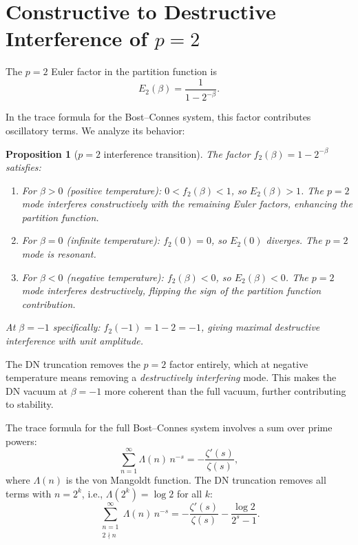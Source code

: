 \documentclass[12pt,a4paper]{article}
\newtheorem{proposition}[theorem]{Proposition}
\begin{document}
\section{Constructive to Destructive Interference of $p=2$}
\label{sec:interference}

The $p=2$ Euler factor in the partition function is
\begin{equation}
  E_2(\beta) = \frac{1}{1-2^{-\beta}}.
\end{equation}

In the trace formula for the Bost--Connes system, this factor contributes oscillatory terms. We analyze its behavior:

\begin{proposition}[$p=2$ interference transition]\label{prop:interference}
The factor $f_2(\beta) = 1 - 2^{-\beta}$ satisfies:
\begin{enumerate}[label=(\roman*)]
\item For $\beta > 0$ (positive temperature): $0 < f_2(\beta) < 1$, so $E_2(\beta) > 1$. The $p=2$ mode interferes \emph{constructively} with the remaining Euler factors, enhancing the partition function.
\item For $\beta = 0$ (infinite temperature): $f_2(0) = 0$, so $E_2(0)$ diverges. The $p=2$ mode is resonant.
\item For $\beta < 0$ (negative temperature): $f_2(\beta) < 0$, so $E_2(\beta) < 0$. The $p=2$ mode interferes \emph{destructively}, flipping the sign of the partition function contribution.
\end{enumerate}
At $\beta = -1$ specifically: $f_2(-1) = 1 - 2 = -1$, giving maximal destructive interference with unit amplitude.
\end{proposition}

The DN truncation removes the $p=2$ factor entirely, which at negative temperature means removing a \emph{destructively interfering} mode. This makes the DN vacuum at $\beta = -1$ more coherent than the full vacuum, further contributing to stability.

The trace formula for the full Bost--Connes system involves a sum over prime powers:
\begin{equation}
  \sum_{n=1}^{\infty}\Lambda(n)\,n^{-s} = -\frac{\zeta'(s)}{\zeta(s)},
\end{equation}
where $\Lambda(n)$ is the von Mangoldt function. The DN truncation removes all terms with $n = 2^k$, i.e., $\Lambda(2^k) = \log 2$ for all $k$:
\begin{equation}
  \sum_{\substack{n=1 \\ 2\nmid n}}^{\infty}\Lambda(n)\,n^{-s} = -\frac{\zeta'(s)}{\zeta(s)} - \frac{\log 2}{2^s - 1}.
\end{equation}
\end{document}
